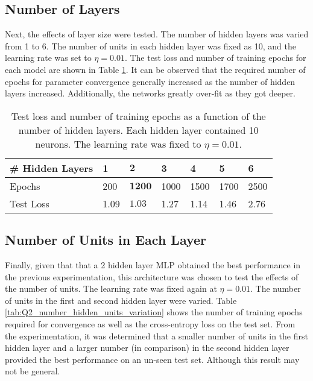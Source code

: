 \documentclass{article}[12 pt]
\begin{document}
\subsection*{Number of Layers}
Next, the effects of layer size were tested.  The number of hidden layers was varied from 1 to 6.  The number of units in each hidden layer was fixed as 10, and the learning rate was set to $\eta=0.01$.  The test loss and number of training epochs for each model are shown in Table \ref{tab:Q2_number_hidden_layer_variation}.  It can be observed that the required number of epochs for parameter convergence generally increased as the number of hidden layers increased.  Additionally, the networks greatly over-fit as they got deeper.  

\begin{table}[H]
	\caption{Test loss and number of training epochs as a function of the number of hidden layers.  Each hidden layer contained 10 neurons.  The learning rate was fixed to $\eta=0.01$.}
	\label{tab:Q2_number_hidden_layer_variation}
	\begin{center}
		\begin{tabularx}{\textwidth}{ |X|X|X|X|X|X|X| } 
			\hline
			\# Hidden Layers & 1 & $\bm{2}$ & 3 & 4 & 5 & 6\\
			\hline
			Epochs & 200 &  $\bm{1200}$ & 1000 & 1500 & 1700 & 2500\\
			\hline
			Test Loss & 1.09 & $\bm{1.03}$ & 1.27 & 1.14 & 1.46 & 2.76\\
			\hline
		\end{tabularx}
	\end{center}
\end{table}

\subsection*{Number of Units in Each Layer}
Finally, given that that a 2 hidden layer MLP obtained the best performance in the previous experimentation, this architecture was chosen to test the effects of the number of units.  The learning rate was fixed again at $\eta=0.01$.  The number of units in the first and second hidden layer were varied.  Table \ref{tab:Q2_number_hidden_units_variation} shows the number of training epochs required for convergence as well as the cross-entropy loss on the test set.  From the experimentation, it was determined that a smaller number of units in the first hidden layer and a larger number (in comparison) in the second hidden layer provided the best performance on an un-seen test set.  Although this result may not be general.
\end{document}
